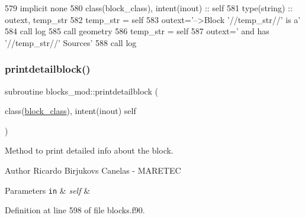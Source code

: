 \begin{DoxyCode}
579     \textcolor{keywordtype}{implicit none}
580     \textcolor{keywordtype}{class}(block\_class), \textcolor{keywordtype}{intent(inout)} :: self
581     \textcolor{keywordtype}{type}(string) :: outext, temp\_str
582     temp\_str = self%
583     outext=\textcolor{stringliteral}{'-->Block '}//temp\_str//\textcolor{stringliteral}{' is a'}
584     \textcolor{keyword}{call }log%
585     \textcolor{keyword}{call }geometry%
586     temp\_str = self%
587     outext=\textcolor{stringliteral}{'      and has '}//temp\_str//\textcolor{stringliteral}{' Sources'}
588     \textcolor{keyword}{call }log%
\end{DoxyCode}
\mbox{\label{namespaceblocks__mod_a10f356706988c45a255922fe70851488}} 
\subsubsection{\texorpdfstring{printdetailblock()}{printdetailblock()}}
{\footnotesize\ttfamily subroutine blocks\+\_\+mod\+::printdetailblock (\begin{DoxyParamCaption}\item[{class(\mbox{\hyperlink{structblocks__mod_1_1block__class}{block\+\_\+class}}), intent(inout)}]{self }\end{DoxyParamCaption})\hspace{0.3cm}{\ttfamily [private]}}



Method to print detailed info about the block. 

\begin{DoxyAuthor}{Author}
Ricardo Birjukovs Canelas -\/ M\+A\+R\+E\+T\+EC 
\end{DoxyAuthor}

\begin{DoxyParams}[1]{Parameters}
\mbox{\tt in}  & {\em self} & \\
\hline
\end{DoxyParams}


Definition at line 598 of file blocks.\+f90.



